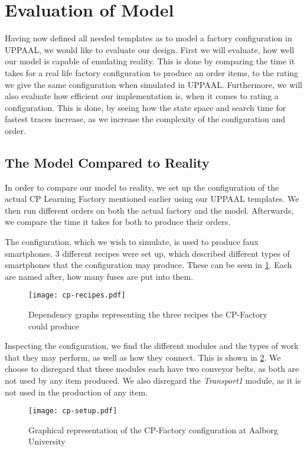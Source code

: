 \section{Evaluation of Model}
Having now defined all needed templates as to model a factory configuration in UPPAAL, we would like to evaluate our design. First we will evaluate, how well our model is capable of emulating reality. This is done by comparing the time it takes for a real life factory configuration to produce an order items, to the rating we give the same configuration when simulated in UPPAAL. Furthermore, we will also evaluate how efficient our implementation is, when it comes to rating a configuration. This is done, by seeing how the state space and search time for fastest traces increase, as we increase the complexity of the configuration and order. 

\subsection{The Model Compared to Reality} \label{ssec:realcomparison}
In order to compare our model to reality, we set up the configuration of the actual CP Learning Factory mentioned earlier using our UPPAAL templates. We then run different orders on both the actual factory and the model. Afterwards, we compare the time it takes for both to produce their orders.  

The configuration, which we wish to simulate, is used to produce faux smartphones. 3 different recipes were set up, which described different types of smartphones that the configuration may produce. These can be seen in \cref{fig:cp-recipes}. Each are named after, how many fuses are put into them.

\begin{figure}[h]
\centering
\texttt{[image: cp-recipes.pdf]}
\caption{Dependency graphs representing the three recipes the CP-Factory could produce}
\label{fig:cp-recipes}
\end{figure}

Inspecting the configuration, we find the different modules and the types of work that they may perform, as well as how they connect. This is shown in \cref{fig:cp-setup}. We choose to disregard that these modules each have two conveyor belts, as both are not used by any item produced. We also disregard the \textit{Transport1} module, as it is not used in the production of any item.

\begin{figure}[h]
\centering
\texttt{[image: cp-setup.pdf]}
\caption{Graphical representation of the CP-Factory configuration at Aalborg University}
\label{fig:cp-setup}
\end{figure}

